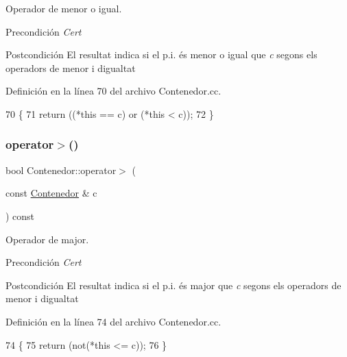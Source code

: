 Operador de menor o igual. 

\begin{DoxyPrecond}{Precondición}
{\itshape Cert} 
\end{DoxyPrecond}
\begin{DoxyPostcond}{Postcondición}
El resultat indica si el p.\+i. és menor o igual que {\itshape c} segons els operadors de menor i d\textquotesingle{}igualtat 
\end{DoxyPostcond}


Definición en la línea 70 del archivo Contenedor.\+cc.


\begin{DoxyCode}
70                                                      \{
71   \textcolor{keywordflow}{return} ((*\textcolor{keyword}{this} == c) or (*\textcolor{keyword}{this} < c));
72 \}
\end{DoxyCode}
\mbox{\label{class_contenedor_a9520b1def419e6d64e879ab5b594e3a8}} 
\subsubsection{\texorpdfstring{operator$>$()}{operator>()}}
{\footnotesize\ttfamily bool Contenedor\+::operator$>$ (\begin{DoxyParamCaption}\item[{const \hyperlink{class_contenedor}{Contenedor} \&}]{c }\end{DoxyParamCaption}) const}



Operador de major. 

\begin{DoxyPrecond}{Precondición}
{\itshape Cert} 
\end{DoxyPrecond}
\begin{DoxyPostcond}{Postcondición}
El resultat indica si el p.\+i. és major que {\itshape c} segons els operadors de menor i d\textquotesingle{}igualtat 
\end{DoxyPostcond}


Definición en la línea 74 del archivo Contenedor.\+cc.


\begin{DoxyCode}
74                                                     \{
75   \textcolor{keywordflow}{return} (not(*\textcolor{keyword}{this} <= c));
76 \}
\end{DoxyCode}
\mbox{\label{class_contenedor_a7f95853ed98513ffc10c9213df656cfd}} 
